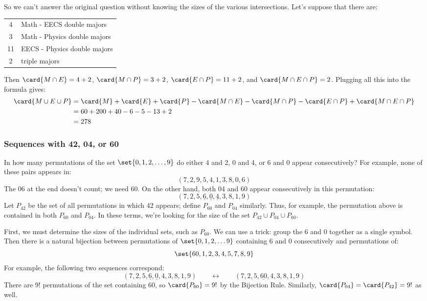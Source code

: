 So we can't answer the original question without knowing the sizes of
the various intersections.  Let's suppose that there are:
%
\begin{center}
\begin{tabular}{cl}
4 & Math - EECS double majors \\
3 & Math - Physics double majors \\
11 & EECS - Physics double majors \\
2 & triple majors
\end{tabular}
\end{center}
%
Then $\card{M \cap E} = 4 + 2$, $\card{M \cap P} = 3 + 2$, $\card{E
\cap P} = 11 + 2$, and $\card{M \cap E \cap P} = 2$.  Plugging all this
into the formula gives:
%
\begin{align*}
\card{M \cup E \cup P}
    & = \card{M} + \card{E} + \card{P}
      - \card{M \cap E} - \card{M \cap P} - \card{E \cap P}
      + \card{M \cap E \cap P} \\
    & = 60 + 200 + 40 - 6 - 5 - 13 + 2 \\
    & = 278
\end{align*}

\subsubsection{Sequences with 42, 04, or 60}

In how many permutations of the set $\set{0, 1, 2, \dots, 9}$ do
either 4 and 2, 0 and 4, or 6 and 0 appear consecutively?  For
example, none of these pairs appears in:
%
\[
(7, 2, 9, 5, 4, 1, 3, 8, 0, 6)
\]
%
The 06 at the end doesn't count; we need 60.  On the other hand, both
04 and 60 appear consecutively in this permutation:
%
\[
(7, 2, 5, \underline{6}, \underline{0}, \underline{4}, 3, 8, 1, 9)
\]
%
Let $P_{42}$ be the set of all permutations in which 42 appears; define
$P_{60}$ and $P_{04}$ similarly.  Thus, for example, the permutation above
is contained in both $P_{60}$ and $P_{04}$.  In these terms, we're looking
for the size of the set $P_{42} \cup P_{04} \cup P_{60}$.

First, we must determine the sizes of the individual sets, such as
$P_{60}$.  We can use a trick: group the 6 and 0 together as a single
symbol.  Then there is a natural bijection between permutations of
$\set{0, 1, 2, \dots 9}$ containing 6 and 0 consecutively and
permutations of:
%
\[
\set{60, 1, 2, 3, 4, 5, 7, 8, 9}
\]
%
For example, the following two sequences correspond:
%
\[
(7, 2, 5, \underline{6}, \underline{0}, 4, 3, 8, 1, 9)
\qquad \leftrightarrow \qquad
(7, 2, 5, \underline{60}, 4, 3, 8, 1, 9)
\]
%
There are $9!$ permutations of the set containing 60, so
$\card{P_{60}} = 9!$ by the Bijection Rule.  Similarly, $\card{P_{04}}
= \card{P_{42}} = 9!$ as well.

